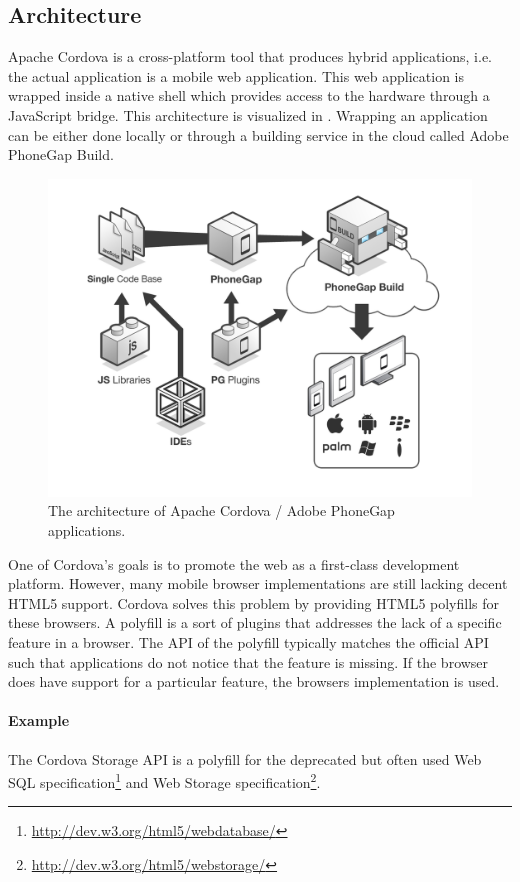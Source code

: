 \subsection{Architecture}
\label{sec:cordova:architecture}

Apache Cordova is a cross-platform tool that produces hybrid applications, i.e. the actual application is a mobile web application. This web application is wrapped inside a native shell which provides access to the hardware through a JavaScript bridge. This architecture is visualized in . Wrapping an application can be either done locally or through a building service in the cloud called Adobe PhoneGap Build.

\begin{figure}
    \begin{center}
        \includegraphics[width=.8\textwidth]{figs/cordova-architecture.png}
        \caption{The architecture of Apache Cordova / Adobe PhoneGap applications.}
        \label{fig:cordova:architecture}
    \end{center}
\end{figure}

One of Cordova's goals is to promote the web as a first-class development platform. However, many mobile browser implementations are still lacking decent HTML5 support. Cordova solves this problem by providing HTML5 polyfills for these browsers. A polyfill is a sort of plugins that addresses the lack of a specific feature in a browser. The API of the polyfill typically matches the official API such that applications do not notice that the feature is missing. If the browser does have support for a particular feature, the browsers implementation is used. 

\paragraph{Example} The Cordova Storage API is a polyfill for the deprecated but often used Web SQL specification\footnote{\url{http://dev.w3.org/html5/webdatabase/}} and Web Storage specification\footnote{\url{http://dev.w3.org/html5/webstorage/}}. 

